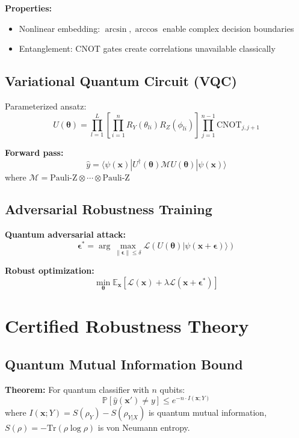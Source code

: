 \documentclass[conference]{IEEEtran}
\begin{document}
\textbf{Properties:}
\begin{itemize}
\item Nonlinear embedding: $\arcsin, \arccos$ enable complex decision boundaries
\item Entanglement: CNOT gates create correlations unavailable classically
\end{itemize}

\subsection{Variational Quantum Circuit (VQC)}
Parameterized ansatz:
\begin{equation}
U(\boldsymbol{\theta}) = \prod_{l=1}^L \left[\prod_{i=1}^n R_Y(\theta_{li}) R_Z(\phi_{li})\right] \prod_{j=1}^{n-1} \text{CNOT}_{j,j+1}
\end{equation}

\textbf{Forward pass:}
\begin{equation}
\hat{y} = \langle \psi(\mathbf{x}) | U^\dagger(\boldsymbol{\theta}) \mathcal{M} U(\boldsymbol{\theta}) | \psi(\mathbf{x}) \rangle
\end{equation}
where $\mathcal{M} = \text{Pauli-Z} \otimes \cdots \otimes \text{Pauli-Z}$

\subsection{Adversarial Robustness Training}
\textbf{Quantum adversarial attack:}
\begin{equation}
\boldsymbol{\epsilon}^* = \arg\max_{\|\boldsymbol{\epsilon}\| \leq \delta} \mathcal{L}(U(\boldsymbol{\theta}) |\psi(\mathbf{x} + \boldsymbol{\epsilon})\rangle)
\end{equation}

\textbf{Robust optimization:}
\begin{equation}
\min_{\boldsymbol{\theta}} \mathbb{E}_{\mathbf{x}} \left[\mathcal{L}(\mathbf{x}) + \lambda \mathcal{L}(\mathbf{x} + \boldsymbol{\epsilon}^*)\right]
\end{equation}

\section{Certified Robustness Theory}

\subsection{Quantum Mutual Information Bound}
\textbf{Theorem:} For quantum classifier with $n$ qubits:
\begin{equation}
\mathbb{P}[\hat{y}(\mathbf{x}') \neq y] \leq e^{-n \cdot I(\mathbf{x}; Y)}
\end{equation}
where $I(\mathbf{x}; Y) = S(\rho_Y) - S(\rho_{Y|X})$ is quantum mutual information, $S(\rho) = -\text{Tr}(\rho \log \rho)$ is von Neumann entropy.
\end{document}
